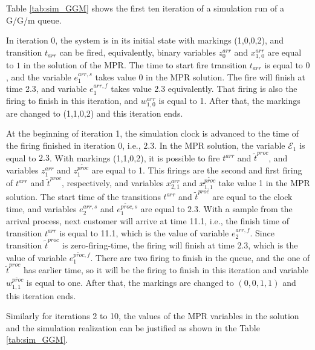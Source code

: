 \documentclass[suppldata]{interact}
\theoremstyle{plain}
\theoremstyle{definition}
\theoremstyle{remark}
\begin{document}
Table \ref{tab:sim_GGM} shows the first ten iteration of a simulation run of a G/G/m queue.

In iteration 0, the system is in its initial state with markings (1,0,0,2), and transition $t_{arr}$ can be fired, equivalently, binary variables $z^{arr}_0$ and $x^{arr}_{1,0}$ are equal to $1$ in the solution of the MPR. The time to start fire transition $t_{arr}$ is equal to $0$, and the variable $e^{arr,s}_{1}$ takes value $0$ in the MPR solution. The fire will finish at time 2.3, and variable $e^{arr,f}_{1}$ takes value 2.3 equivalently. That firing is also the firing to finish in this iteration, and $w^{arr}_{1,0}$ is equal to 1. After that, the markings are changed to (1,1,0,2) and this iteration ends. 

At the beginning of iteration 1, the simulation clock is advanced to the time of the firing finished in iteration 0, i.e., $2.3$. In the MPR solution, the variable $\mathcal{E}_1$ is equal to $2.3$. With markings (1,1,0,2), it is possible to fire $t^{arr}$ and $\tilde{t}^{proc}$, and variables $z_1^{arr}$ and $z_1^{\tilde{proc}}$ are equal to 1. This firings are the second and first firing of $t^{arr}$ and $\tilde{t}^{proc}$, respectively, and variables $x_{2,1}^{arr}$ and $x_{1,1}^{\tilde{proc}}$ take value 1 in the MPR solution. The start time of the transitions $t^{arr}$ and $\tilde{t}^{proc}$ are equal to the clock time, and variables $e^{arr,s}_{2}$ and $e^{\tilde{proc},s}_{1}$ are equal to $2.3$. With a sample from the arrival process, next customer will arrive at time 11.1, i.e., the finish time of transition $t^{arr}$ is equal to 11.1, which is the value of variable $e^{arr,f}_{2}$. Since transition $\tilde{t}^{proc}$ is zero-firing-time, the firing will finish at time 2.3, which is the value of variable $e^{\tilde{proc},f}_{1}$. There are two firing to finish in the queue, and the one of $\tilde{t}^{proc}$ has earlier time, so it will be the firing to finish in this iteration and variable $w^{\tilde{proc}}_{1,1}$ is equal to one. After that, the markings are changed to $(0,0,1,1)$ and this iteration ends. 

Similarly for iterations 2 to 10, the values of the MPR variables in the solution and the simulation realization can be justified as shown in the Table \ref{tab:sim_GGM}.
 
\end{document}
